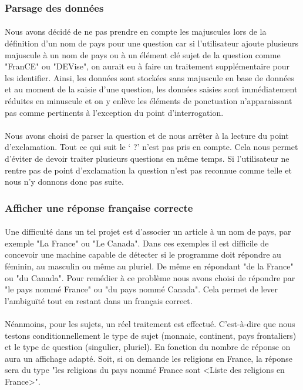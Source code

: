\documentclass[11pt,a4paper]{article}
\begin{document}
\subsubsection{Parsage des données}

\paragraph{}Nous avons décidé de ne pas prendre en compte les majuscules lors de la définition d'un nom de pays pour une question car si l'utilisateur ajoute plusieurs majuscule à un nom de pays ou à un élément clé sujet de la question comme "FranCE" ou "DEVise", on aurait eu à faire un traitement supplémentaire pour les identifier. Ainsi, les données sont stockées sans majuscule en base de données et au moment de la saisie d'une question, les données saisies sont immédiatement réduites en minuscule et on y enlève les éléments de ponctuation n'apparaissant pas comme pertinents à l'exception du point d'interrogation. 
\paragraph{}Nous avons choisi de parser la question et de nous arrêter à la lecture du point d’exclamation. Tout ce qui suit le ‘ ?’ n’est pas pris en compte. Cela nous permet d’éviter de devoir traiter plusieurs questions en même temps. Si l’utilisateur ne rentre pas de point d’exclamation la question n’est pas reconnue comme telle et nous n’y donnons donc pas suite.

\subsubsection{Afficher une réponse française correcte}

\paragraph{}Une difficulté dans un tel projet est d'associer un article à un nom de pays, par exemple "La France" ou "Le Canada". Dans ces exemples il est difficile de concevoir une machine capable de détecter si le programme doit répondre au féminin, au masculin ou même au pluriel. De même en répondant "de la France" ou "du Canada". Pour remédier à ce problème nous avons choisi de répondre par "le pays nommé France" ou "du pays nommé Canada". Cela permet de lever l'ambiguïté tout en restant dans un français correct. 
\paragraph{}Néanmoins, pour les sujets, un réel traitement est effectué. C'est-à-dire que nous testons conditionnellement le type de sujet (monnaie, continent, pays frontaliers) et le type de question (singulier, pluriel). En fonction du nombre de réponse on aura un affichage adapté. Soit, si on demande les religions en France, la réponse sera du type "les religions du pays nommé France sont <Liste des religions en France>". 
\end{document}
